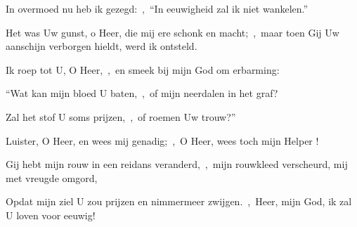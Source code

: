 \documentclass[12pt,twoside,a5paper]{article}
\begin{document}

\begin{halfparskip}
  In overmoed nu heb ik gezegd:~\sep\ ``In eeuwigheid zal ik niet wankelen.''

  Het was Uw gunst, o Heer, die mij ere schonk en macht;~\sep\ maar toen Gij Uw aanschijn verborgen hieldt, werd ik ontsteld.

  Ik roep tot U, O Heer,~\sep\ en smeek bij mijn God om erbarming:

  ``Wat kan mijn bloed U baten,~\sep\ of mijn neerdalen in het graf?

  Zal het stof U soms prijzen,~\sep\ of roemen Uw trouw?''

  Luister, O Heer, en wees mij genadig;~\sep\ O Heer, wees toch mijn Helper !

  Gij hebt mijn rouw in een reidans veranderd,~\sep\ mijn rouwkleed verscheurd, mij met vreugde omgord,

  Opdat mijn ziel U zou prijzen en nimmermeer zwijgen.~\sep\ Heer, mijn God, ik zal U loven voor eeuwig!
\end{halfparskip}


\PSALMtitle{}{}

\psalmsubtitle{}

\begin{halfparskip}
  \qanona{}
\end{halfparskip}

\psalmsubtitle{}

\begin{halfparskip}
\end{halfparskip}

\end{document}
